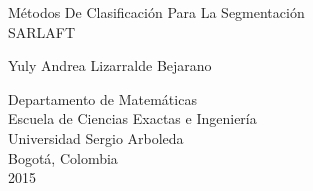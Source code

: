 \begin{titlepage}

  \begin{center}

    {\LARGE M\'etodos De Clasificaci\'on Para La Segmentaci\'on \\ SARLAFT}

    \vspace*{\fill}

    {\large Yuly Andrea Lizarralde Bejarano}

    \vspace*{\fill}

    {\large Departamento de Matem\'aticas}\\
    {\large Escuela de Ciencias Exactas e Ingenier\'ia}\\
    {\large Universidad Sergio Arboleda}\\
    {\large Bogot\'a, Colombia}\\
    {\large 2015}

  \end{center}

\end{titlepage}
